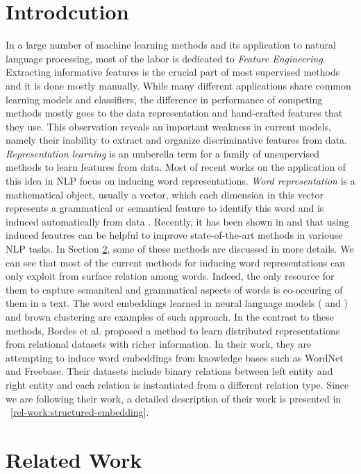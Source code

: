 \documentclass[preprint,12pt]{elsarticle}
\begin{document}
\section{Introdcution}
\label{sec:intro}
In a large number of machine learning methods and its application to natural language processing,
 most of the labor is dedicated to \emph{Feature Engineering}. Extracting informative features is the crucial part
of most supervised methods and it is done mostly manually. While many different
applications share common learning models and classifiers, the difference in
performance of competing methods mostly goes to the data representation and
hand-crafted features that they use. This observation reveals an important
weakness in current models, namely their inability to extract and organize
discriminative features from data. \emph{Representation learning} is an umberella term
for a family of unsupervised methods to learn features from data. Most of recent
works on the application of this idea in NLP focus on inducing word
representations. \emph{Word representation} is a mathematical object, usually a
vector, which each dimension in this vector represents a grammatical or
semantical feature to identify this word and is induced automatically from data
\cite{Turian2010b}. Recently, it has been shown in \cite{Turian2010b} and \cite{Collobert2011} that using
 induced feautres can be helpful to improve state-of-the-art methods in 
variouse NLP tasks. In Section \ref{sec:rel-work}, some of these methods are discussed in more details.
We can see that most of the current methods for inducing word representations can only exploit from surface relation among words. 
Indeed, the only resource for them to capture semanitcal and grammatical aspects of words is co-occuring of them in a text.
The word embeddings learned in neural language models (\cite{} and \cite{}) and brown clustering are 
examples of such approach.
In the contrast to these methods, Bordes et al. \cite{Bordes2011} proposed a method to 
learn distributed representations from relational datasets with richer information.
 In their work, they are  attempting to induce  word embeddings from knowledge bases such as WordNet and Freebase.
 Their datasets include binary relations between left entity and right entity and each relation is instantiated from 
 a different relation type. Since we are following their work, a detailed description of their work is presented
 in ~\ref{rel-work:structured-embedding}. 
 

     

\section{Related Work}
\label{sec:rel-work}
\end{document}
